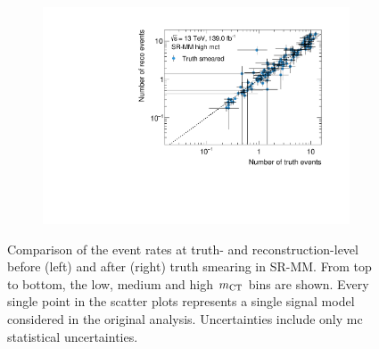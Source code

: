 \begin{figure}
\begin{subfigure}[b]{0.49\linewidth}
	\end{subfigure}\hfill
	\begin{subfigure}[b]{0.49\linewidth}
		\centering\includegraphics[width=\textwidth]{yields_SR-MM_high_mct_smeared}
	\end{subfigure}
	\caption{Comparison of the event rates at truth- and reconstruction-level before (left) and after (right) truth smearing in SR-MM. From top to bottom, the low, medium and high $m_{\textrm{CT}}$ bins are shown. Every single point in the scatter plots represents a single signal model considered in the original \onelepton analysis. Uncertainties include only \gls{mc} statistical uncertainties.}
	\label{fig:smearing_signal_regions_2}
\end{figure}

